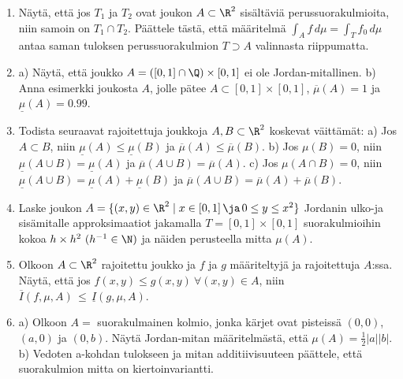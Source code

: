 \Harj
\begin{enumerate}

\item \label{H-uint-1: T:n valinta}
Näytä, että jos $T_1$ ja $T_2$ ovat joukon $A\subset\R^2$ sisältäviä perussuorakulmioita, niin
samoin on $T_1 \cap T_2$. Päättele tästä, että määritelmä $\int_A f\,d\mu=\int_T f_0\,d\mu$
antaa saman tuloksen perussuorakulmion $T \supset A$ valinnasta riippumatta.

\item \label{H-uint-1: esimerkkejä}
a) Näytä, että joukko $A=([0,1]\cap\Q)\times[0,1]$ ei ole Jordan-mitallinen. \newline
b) Anna esimerkki joukosta $A$, jolle pätee $A\subset[0,1]\times[0,1]$, $\overline{\mu}(A)=1$
ja $\underline{\mu}(A)=0.99$.

\item \label{H-uint-1: väittämiä}
Todista seuraavat rajoitettuja joukkoja $A,B\subset\R^2$ koskevat
väittämät:  \vspace{1mm}\newline 
a) Jos $A \subset B$, niin $\underline{\mu}(A)\le\underline{\mu}(B)$ ja
$\overline{\mu}(A)\le\overline{\mu}(B)$. \vspace{1mm}\newline
b) Jos $\mu(B)=0 $, niin $\underline{\mu}(A \cup B)=\underline{\mu}(A)$ ja
$\overline{\mu}(A \cup B)=\overline{\mu}(A)$. \vspace{1mm}\newline
c) Jos $\mu(A \cap B)=0$, niin 
$\underline{\mu}(A \cup B)=\underline{\mu}(A)+\underline{\mu}(B)$ ja
$\overline{\mu}(A \cup B)=\overline{\mu}(A)+\overline{\mu}(B)$.

\item 
Laske joukon $A = \{(x,y)\in\R^2 \mid x \in [0, 1]\,\ja\, 0 \le y \le x^2\}$ Jordanin 
ulko-ja sisämitalle approksimaatiot jakamalla $T = [0, 1] \times [0, 1]$ suorakulmioihin kokoa
$h \times h^2\ (h^{-1}\in\N)$ ja näiden perusteella mitta $\mu(A)$.

\item
Olkoon $A\subset\R^2$ rajoitettu joukko ja $f$ ja $g$ määriteltyjä ja rajoitettuja $A$:ssa.
Näytä, että jos $f(x,y) \le g(x,y)\ \forall (x,y) \in A$, niin
$\overline{I}(f,\mu,A)\,\le\,\underline{I}(g,\mu,A)$. 

\item \label{H-uint-1: kiertoinvarianssi a}
a) Olkoon $A=$ suorakulmainen kolmio, jonka kärjet ovat pisteissä $(0,0)$, $(a, 0)$ ja $(0, b)$.
Näytä Jordan-mitan määritelmästä, että $\mu(A) = \frac{1}{2} |a| |b|$. \vspace{1mm}\newline
b) Vedoten a-kohdan tulokseen ja mitan additiivisuuteen päättele, että suorakulmion mitta on 
kiertoinvariantti.


\end{enumerate}

